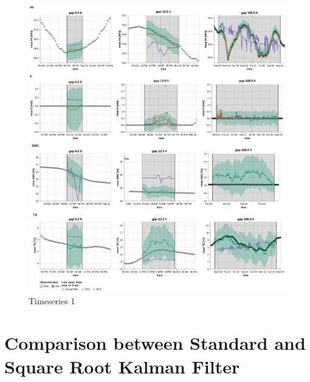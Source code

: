 \documentclass{article}
\newcommand{\imgwidth}{6in}
\let\Oldsection\section
\renewcommand{\section}{\FloatBarrier\Oldsection}
\begin{document}
\begin{figure}
\centerline{\includegraphics[width=\imgwidth]{timeseries_2_2}}
\caption{Timeseries 1}
\label{fig:ts_2_2}
\end{figure}

\section{Comparison between Standard and Square Root Kalman Filter}
\end{document}
